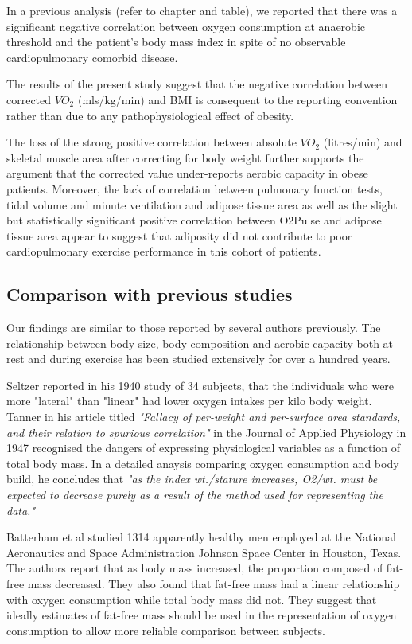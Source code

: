 In a previous analysis (refer to chapter and table), we reported that there was a significant negative correlation between oxygen consumption at anaerobic threshold and the patient's body mass index in spite of no observable cardiopulmonary comorbid disease. 

The results of the present study suggest that the negative correlation between corrected $VO_{2}$ (mls/kg/min) and BMI is consequent to the reporting convention rather than due to any pathophysiological effect of obesity. 

The loss of the strong positive correlation between absolute $VO_{2}$ (litres/min) and skeletal muscle area after correcting for body weight further supports the argument that the corrected value under-reports aerobic capacity in obese patients. Moreover, the lack of correlation between pulmonary function tests, tidal volume and minute ventilation and adipose tissue area as well as the slight but statistically significant positive correlation between O2Pulse and adipose tissue area appear to suggest that adiposity did not contribute to poor cardiopulmonary exercise performance in this cohort of patients.

\subsection{Comparison with previous studies}
Our findings are similar to those reported by several authors previously. The relationship between body size, body composition and aerobic capacity both at rest and during exercise has been studied extensively for over a hundred years. 

Seltzer reported in his 1940 study of 34 subjects, that the individuals who were more "lateral" than "linear" had lower oxygen intakes per kilo body weight.\parencite{seltzer_body_1940} Tanner in his article titled \textit{"Fallacy of per-weight and per-surface area standards, and their relation to spurious correlation"}\parencite{tanner_fallacy_1949} in the Journal of Applied Physiology in 1947 recognised the dangers of expressing physiological variables as a function of total body mass. In a detailed anaysis comparing oxygen consumption and body build, he concludes that \textit{"as the index wt./stature increases, O2/wt. must be expected to decrease purely as a result of the method used for representing the data." }

Batterham et al studied 1314 apparently healthy men employed at the National Aeronautics and Space Administration Johnson Space Center in Houston, Texas.\parencite{batterham_modeling_1999} The authors report that as body mass increased, the proportion composed of fat-free mass decreased. They also found that fat-free mass had a linear relationship with oxygen consumption while total body mass did not. They suggest that ideally estimates of fat-free mass should be used in the representation of oxygen consumption to allow more reliable comparison between subjects. 

